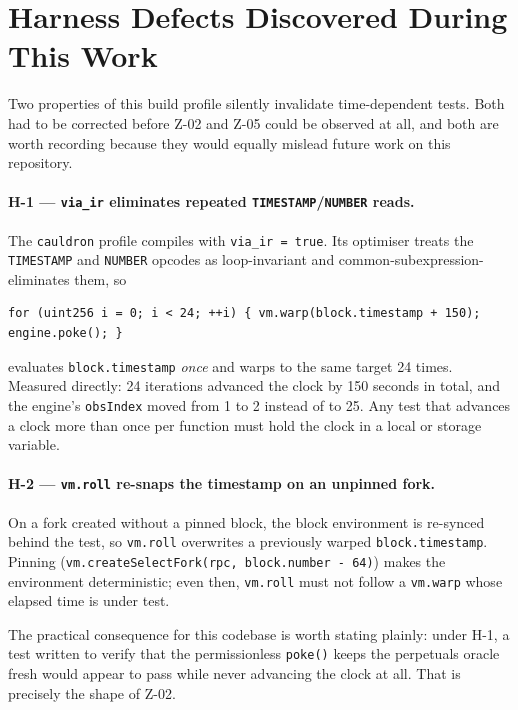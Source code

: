 \documentclass[10pt,a4paper]{article}
\newcommand{\code}[1]{\texttt{\small #1}}
\begin{document}
\section{Harness Defects Discovered During This Work}\label{sec:harness}

Two properties of this build profile silently invalidate time-dependent tests. Both had to
be corrected before Z-02 and Z-05 could be observed at all, and both are worth recording
because they would equally mislead future work on this repository.

\paragraph{H-1 --- \code{via\_ir} eliminates repeated \code{TIMESTAMP}/\code{NUMBER} reads.}
The \code{cauldron} profile compiles with \code{via\_ir = true}. Its optimiser treats the
\code{TIMESTAMP} and \code{NUMBER} opcodes as loop-invariant and
common-subexpression-eliminates them, so

\begin{lstlisting}
for (uint256 i = 0; i < 24; ++i) { vm.warp(block.timestamp + 150); engine.poke(); }
\end{lstlisting}

evaluates \code{block.timestamp} \emph{once} and warps to the same target 24 times. Measured
directly: 24 iterations advanced the clock by 150 seconds in total, and the engine's
\code{obsIndex} moved from 1 to 2 instead of to 25. Any test that advances a clock more
than once per function must hold the clock in a local or storage variable.

\paragraph{H-2 --- \code{vm.roll} re-snaps the timestamp on an unpinned fork.} On a fork
created without a pinned block, the block environment is re-synced behind the test, so
\code{vm.roll} overwrites a previously warped \code{block.timestamp}. Pinning
(\code{vm.createSelectFork(rpc, block.number - 64)}) makes the environment deterministic;
even then, \code{vm.roll} must not follow a \code{vm.warp} whose elapsed time is under
test.

\medskip\noindent
The practical consequence for this codebase is worth stating plainly: under H-1, a test
written to verify that the permissionless \code{poke()} keeps the perpetuals oracle fresh
would appear to pass while never advancing the clock at all. That is precisely the shape of
Z-02.
\end{document}
